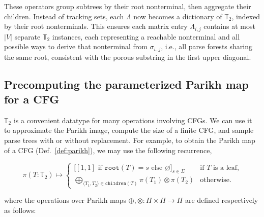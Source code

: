 \documentclass[runningheads]{llncs}
\begin{document}
These operators group subtrees by their root nonterminal, then aggregate their children. Instead of tracking sets, each $\Lambda$ now becomes a dictionary of $\mathbb{T}_2$, indexed by their root nonterminals. This ensures each matrix entry $\Lambda_{i,j}$ contains at most $|V|$ separate $\mathbb{T}_2$ instances, each representing a reachable nonterminal and all possible ways to derive that nonterminal from $\sigma_{i..j}$, i.e., all parse forests sharing the same root, consistent with the porous substring in the first upper diagonal.

  \subsection{Precomputing the parameterized Parikh map for a CFG}\label{sec:ppm}

  $\mathbb{T}_2$ is a convenient datatype for many operations involving CFGs. We can use it to approximate the Parikh image, compute the size of a finite CFG, and sample parse trees with or without replacement. For example, to obtain the Parikh map of a CFG (Def.~\ref{def:parikh}), we may use the following recurrence,

\begin{equation}
  \pi(T: \mathbb{T}_2) \mapsto \begin{cases}
  \big[[1, 1] \text{ if } \texttt{root}(T) = s \text{ else } \varnothing\big]_{s\in \Sigma}  & \text{if $T$ is a leaf,} \\
  \bigoplus_{\langle T_1, T_2\rangle \in \texttt{children}(T)} \pi(T_1) \otimes \pi(T_2) & \text{otherwise.}
  \end{cases}
\end{equation}


  \noindent where the operations over Parikh maps $\oplus, \otimes: \Pi \times \Pi \rightarrow \Pi$ are defined respectively as follows:
\end{document}
